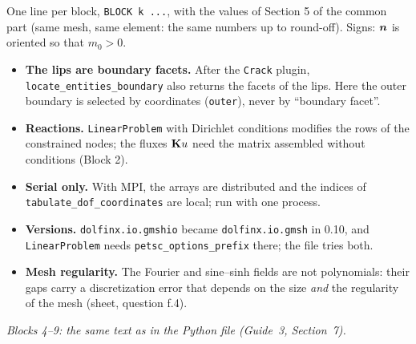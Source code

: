 One line per block, \texttt{BLOCK k ...}, with the values of Section 5 of the
common part (same mesh, same element: the same numbers up to round-off).
Signs: $\bm{n}$ is oriented so that $m_0>0$.

\begin{itemize}[itemsep=1pt]
\item \textbf{The lips are boundary facets.} After the \texttt{Crack} plugin,
\texttt{locate\_entities\_boundary} also returns the facets of the lips. Here
the outer boundary is selected by coordinates (\texttt{outer}), never by
``boundary facet''.
\item \textbf{Reactions.} \texttt{LinearProblem} with Dirichlet conditions
modifies the rows of the constrained nodes; the fluxes $\mathbf{K}u$ need the
matrix assembled without conditions (Block 2).
\item \textbf{Serial only.} With MPI, the arrays are distributed and the
indices of \texttt{tabulate\_dof\_coordinates} are local; run with one
process.
\item \textbf{Versions.} \texttt{dolfinx.io.gmshio} became \texttt{dolfinx.io.gmsh}
in 0.10, and \texttt{LinearProblem} needs \texttt{petsc\_options\_prefix} there;
the file tries both.
\item \textbf{Mesh regularity.} The Fourier and sine--sinh fields are not
polynomials: their gaps carry a discretization error that depends on the size
\emph{and} the regularity of the mesh (sheet, question f.4).
\end{itemize}


\noindent\emph{Blocks 4--9: the same text as in the Python file (Guide~3,
Section~7).}
